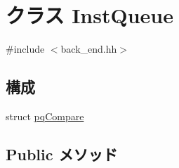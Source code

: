 \hypertarget{classBackEnd_1_1InstQueue}{
\section{クラス InstQueue}
\label{classBackEnd_1_1InstQueue}
}


{\ttfamily \#include $<$back\_\-end.hh$>$}\subsection*{構成}
\begin{DoxyCompactItemize}
\item 
struct \hyperlink{structBackEnd_1_1InstQueue_1_1pqCompare}{pqCompare}
\end{DoxyCompactItemize}
\subsection*{Public メソッド}
